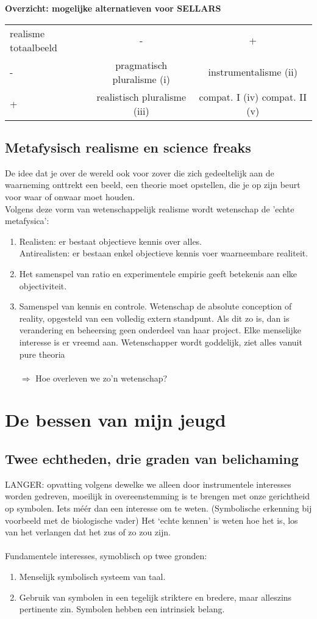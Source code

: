 \documentclass[11pt,a4paper]{article}
\begin{document}
\textbf{Overzicht: mogelijke alternatieven voor SELLARS}
\\
\begin{tabular}{l c c}
\hline
realisme totaalbeeld & - & +
\\
- & pragmatisch pluralisme (i) & instrumentalisme (ii)
\\
+ & realistisch pluralisme (iii) & compat. I (iv) compat. II (v)
\\
\hline
\end{tabular}
\subsection{Metafysisch realisme en science freaks}
De idee dat je over de wereld ook voor zover die zich gedeeltelijk aan de waarneming onttrekt een beeld, een theorie moet opstellen, die je op zijn beurt voor waar of onwaar moet houden.
\\
Volgens deze vorm van wetenschappelijk realisme wordt wetenschap de 'echte metafysica':
\begin{enumerate}
\item Realisten: er bestaat objectieve kennis over alles.
\\
Antirealisten: er bestaan enkel objectieve kennis voer waarneembare realiteit.
\item Het samenspel van ratio en experimentele empirie geeft betekenis aan elke objectiviteit.
\item Samenspel van kennis en controle. Wetenschap de absolute conception of reality, opgesteld van een volledig extern standpunt. Als dit zo is, dan is verandering en beheersing geen onderdeel van haar project. Elke menselijke interesse is er vreemd aan. Wetenschapper wordt goddelijk, ziet alles vanuit pure theoria
\\
\\
$\Rightarrow$ Hoe overleven we zo'n wetenschap?
\end{enumerate}
\section{De bessen van mijn jeugd}
\subsection{Twee echtheden, drie graden van belichaming}
LANGER: opvatting volgens dewelke we alleen door instrumentele interesses worden gedreven, moeilijk in overeenstemming is te brengen met onze gerichtheid op symbolen.
Iets méér dan een interesse om te weten. (Symbolische erkenning bij voorbeeld met de biologische vader)
Het ‘echte kennen’ is weten hoe het is, los van het verlangen dat het zus of zo zou zijn.
\\
\\
Fundamentele interesses, symoblisch op twee gronden:
\begin{enumerate}
\item Menselijk symbolisch systeem van taal.
\item Gebruik van symbolen in een tegelijk striktere en bredere, maar alleszins pertinente zin. Symbolen hebben een intrinsiek belang.
\end{enumerate} 
\end{document}
